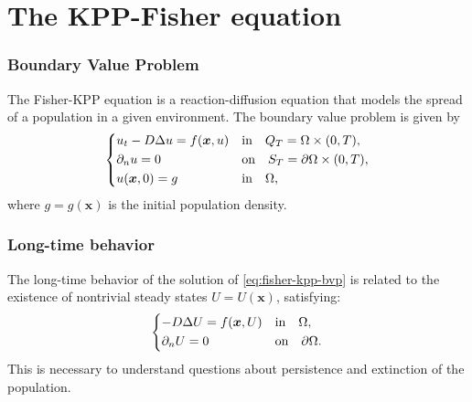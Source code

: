\section{The KPP-Fisher equation}


\begin{frame}
    \frametitle{Boundary Value Problem}
    The Fisher-KPP equation is a reaction-diffusion equation that models the spread of a population in a given environment. The boundary value problem is given by
    \begin{equation}
        \begin{dcases}
            u_t - D \Delta u = f(\bm{x}, u) & \text{in} \quad Q_T = \Omega \times (0, T), \\
            \partial_{n}u = 0 & \text{on} \quad S_T = \partial \Omega \times (0, T), \\
            u(\bm{x}, 0) = g & \text{in} \quad \Omega,
        \end{dcases}
        \label{eq:fisher-kpp-bvp}
    \end{equation}
    where \(g = g(\bm{x})\) is the initial population density.
\end{frame}


\begin{frame}
    \frametitle{Long-time behavior}
    The long-time behavior of the solution of \eqref{eq:fisher-kpp-bvp} is related to the existence of nontrivial steady states \(U = U(\bm{x})\), satisfying:
    \begin{equation}
        \begin{dcases}
            -D \Delta U = f(\bm{x}, U) & \text{in} \quad \Omega, \\
            \partial_{n}U = 0 & \text{on} \quad \partial \Omega.
        \end{dcases}
        \label{eq:fisher-kpp-steady}
    \end{equation}
    This is necessary to understand questions about persistence and extinction of the population.
\end{frame}


